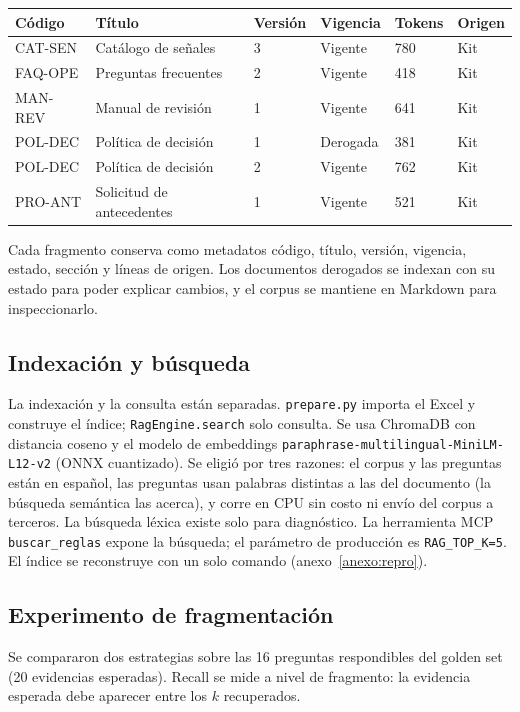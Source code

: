 \documentclass[11pt,a4paper]{article}
\newcommand{\codigo}[1]{\texttt{\small #1}}
\newcommand{\cab}{\rowcolor{azulmira!14}}
\newcommand{\tabla}{\small\rowcolors{2}{white}{grisclaro}}
\begin{document}
\begin{center}\tabla
\begin{tabularx}{\textwidth}{@{}p{1.9cm}Yp{1.5cm}p{1.7cm}p{1.6cm}p{1.5cm}@{}}
\toprule
\cab\textbf{Código} & \textbf{Título} & \textbf{Versión} & \textbf{Vigencia} & \textbf{Tokens} & \textbf{Origen}\\
\midrule
CAT-SEN & Catálogo de señales & 3 & Vigente & 780 & Kit\\
FAQ-OPE & Preguntas frecuentes & 2 & Vigente & 418 & Kit\\
MAN-REV & Manual de revisión & 1 & Vigente & 641 & Kit\\
POL-DEC & Política de decisión & 1 & Derogada & 381 & Kit\\
POL-DEC & Política de decisión & 2 & Vigente & 762 & Kit\\
PRO-ANT & Solicitud de antecedentes & 1 & Vigente & 521 & Kit\\
\bottomrule
\end{tabularx}
\end{center}
Cada fragmento conserva como metadatos código, título, versión, vigencia, estado, sección y líneas de origen. Los documentos derogados se indexan con su estado para poder explicar cambios, y el corpus se mantiene en Markdown para inspeccionarlo.

\subsection{Indexación y búsqueda}
La indexación y la consulta están separadas. \codigo{prepare.py} importa el Excel y construye el índice; \codigo{RagEngine.search} solo consulta. Se usa ChromaDB con distancia coseno y el modelo de embeddings \codigo{paraphrase-multilingual-MiniLM-L12-v2} (ONNX cuantizado). Se eligió por tres razones: el corpus y las preguntas están en español, las preguntas usan palabras distintas a las del documento (la búsqueda semántica las acerca), y corre en CPU sin costo ni envío del corpus a terceros. La búsqueda léxica existe solo para diagnóstico. La herramienta MCP \codigo{buscar\_\allowbreak reglas} expone la búsqueda; el parámetro de producción es \codigo{RAG\_TOP\_K=5}. El índice se reconstruye con un solo comando (anexo~\ref{anexo:repro}).

\subsection{Experimento de fragmentación}
Se compararon dos estrategias sobre las 16 preguntas respondibles del golden set (20 evidencias esperadas). Recall se mide a nivel de fragmento: la evidencia esperada debe aparecer entre los $k$ recuperados.
\end{document}
